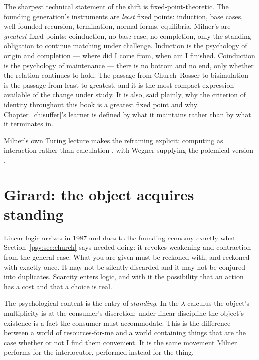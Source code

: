 \begin{remark}
\label{psy:rem:fixpoints}
The sharpest technical statement of the shift is
fixed-point-theoretic.
The founding generation's instruments are \emph{least} fixed points:
induction, base cases, well-founded recursion, termination, normal
forms, equilibria.
Milner's are \emph{greatest} fixed points: coinduction, no base
case, no completion, only the standing obligation to continue
matching under challenge.
Induction is the psychology of origin and completion --- where did I
come from, when am I finished.
Coinduction is the psychology of maintenance --- there is no bottom
and no end, only whether the relation continues to hold.
The passage from Church--Rosser to bisimulation is the passage from
least to greatest, and it is the most compact expression available
of the change under study.
It is also, said plainly, why the criterion of identity throughout
this book is a greatest fixed point and why
Chapter~\ref{ch:suffer}'s learner is defined by what it maintains
rather than by what it terminates in.
\end{remark}

Milner's own Turing lecture makes the reframing explicit: computing
as interaction rather than calculation \cite{milner1993}, with
Wegner supplying the polemical version \cite{wegner1997}.

\section{Girard: the object acquires standing}
\label{psy:sec:girard}

Linear logic \cite{girard1987} arrives in 1987 and does to the
founding economy exactly what Section~\ref{psy:sec:church} says
needed doing: it revokes weakening and contraction from the general
case.
What you are given must be reckoned with, and reckoned with exactly
once.
It may not be silently discarded and it may not be conjured into
duplicates.
Scarcity enters logic, and with it the possibility that an action
has a cost and that a choice is real.

The psychological content is the entry of \emph{standing}.
In the $\lambda$-calculus the object's multiplicity is at the
consumer's discretion; under linear discipline the object's
existence is a fact the consumer must accommodate.
This is the difference between a world of resources-for-me and a
world containing things that are the case whether or not I find them
convenient.
It is the same movement Milner performs for the interlocutor,
performed instead for the thing.

